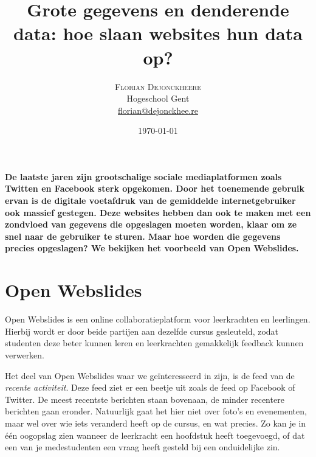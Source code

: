 \documentclass[twoside,twocolumn]{article}
\title{Grote gegevens en denderende data: hoe slaan websites hun data op?} %
\author{%
\textsc{Florian Dejonckheere} \\[1ex] %
\normalsize Hogeschool Gent \\ %
\normalsize \href{mailto:florian@dejonckhee.re}{florian@dejonckhee.re} %
}
\date{\today} %
\begin{document}
\maketitle



\textbf{De laatste jaren zijn grootschalige sociale mediaplatformen zoals Twitten en Facebook sterk opgekomen.
  Door het toenemende gebruik ervan is de digitale voetafdruk van de gemiddelde internetgebruiker ook massief gestegen.
  Deze websites hebben dan ook te maken met een zondvloed van gegevens die opgeslagen moeten worden, klaar om ze snel naar de gebruiker te sturen.
  Maar hoe worden die gegevens precies opgeslagen? We bekijken het voorbeeld van Open Webslides.}\\

\section*{Open Webslides}

Open Webslides is een online collaboratieplatform voor leerkrachten en leerlingen.
Hierbij wordt er door beide partijen aan dezelfde cursus gesleuteld, zodat studenten deze beter kunnen leren en leerkrachten gemakkelijk feedback kunnen verwerken.

Het deel van Open Webslides waar we ge\"{i}nteresseerd in zijn, is de feed van de \textit{recente activiteit}.
Deze feed ziet er een beetje uit zoals de feed op Facebook of Twitter.
De meest recentste berichten staan bovenaan, de minder recentere berichten gaan eronder.
Natuurlijk gaat het hier niet over foto's en evenementen, maar wel over wie iets veranderd heeft op de cursus, en wat precies.
Zo kan je in \'{e}\'{e}n oogopslag zien wanneer de leerkracht een hoofdstuk heeft toegevoegd, of dat een van je medestudenten een vraag heeft gesteld bij een onduidelijke zin.


\end{document}
